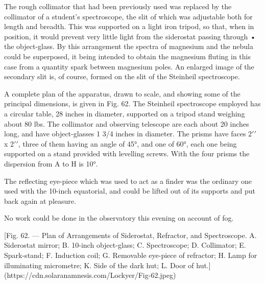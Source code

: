 \documentclass[a4paper, 12pt, oneside, polutonikogreek, english]{article}
\begin{document}
The rough collimator that had been previously used was replaced by the collimator of a student's spectroscope, the slit of which was adjustable both for length and breadth. This was supported on a light iron tripod, so that, when in position, it would prevent very little light from the siderostat passing through • the object-glass. By this arrangement the spectra of magnesium and the nebula could be superposed, it being intended to obtain the magnesium fluting in this case from a quantity spark between magnesium poles. An enlarged image of the secondary slit is, of course, formed on the slit of the Steinheil spectroscope.

A complete plan of the apparatus, drawn to scale, and showing some of the principal dimensions, is given in Fig. 62. The Steinheil spectroscope employed has a circular table, 28 inches in diameter, supported on a tripod stand weighing about 80 lbs. The collimator and observing telescope are each about 20 inches long, and have object-glasses 1 3/4 inches in diameter. The prisms have faces 2$\prime\prime$ x 2$\prime\prime$, three of them having an angle of 45°, and one of 60°, each one being supported on a stand provided with levelling screws. With the four prisms the dispersion from A to H is 10°.

The reflecting eye-piece which was used to act as a finder was the ordinary one used with the 10-inch equatorial, and could be lifted out of its supports and put back again at pleasure.

No work could be done in the observatory this evening on account of fog.

[Fig. 62. --- Plan of Arrangements of Siderostat, Refractor, and Spectroscope. A. Siderostat mirror; B. 10-inch object-glass; C. Spectroscope; D. Collimator; E. Spark-stand; F. Induction coil; G. Removable eye-piece of refractor; H. Lamp for illuminating micrometre; K. Side of the dark hut; L. Door of hut.](https://cdn.solaranamnesis.com/Lockyer/Fig-62.jpeg)
\end{document}
